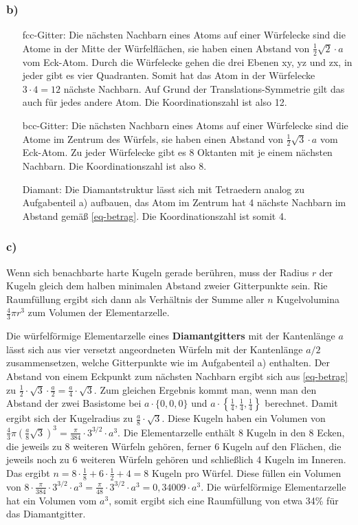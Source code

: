 \documentclass[11pt]{article}
\begin{document}
\subsubsection*{b)}
\begin{itemize}
  \item [fcc-Gitter:] Die nächsten Nachbarn eines Atoms auf einer Würfelecke sind
  die Atome in der Mitte der Würfelflächen, sie haben einen Abstand von
  $\frac{1}{2} \sqrt{2} \cdot a$  vom Eck-Atom. Durch die Würfelecke gehen
  die drei Ebenen xy, yz und zx, in jeder
  gibt es vier Quadranten. Somit hat das Atom in der Würfelecke $3 \cdot 4 = 12$
  nächste Nachbarn. Auf Grund der Translations-Symmetrie gilt das auch für jedes
  andere Atom. Die Koordinationszahl ist also 12.
    \item [bcc-Gitter:] Die nächsten Nachbarn eines Atoms auf einer Würfelecke sind
  die Atome im Zentrum des Würfels, sie haben einen Abstand von $\frac{1}{2} \sqrt{3} \cdot a$
  vom Eck-Atom. Zu jeder Würfelecke gibt es 8 Oktanten mit je einem nächsten Nachbarn.
  Die Koordinationszahl ist also 8.
  \item[Diamant:] Die Diamantstruktur lässt sich mit Tetraedern analog zu
  Aufgabenteil a) aufbauen, das Atom im Zentrum hat 4 nächste Nachbarn im Abstand
  gemäß \eqref{eq-betrag}. Die Koordinationszahl ist somit 4.
\end{itemize}

\subsubsection*{c)} Wenn sich benachbarte harte Kugeln gerade berühren, muss der
Radius $r$ der Kugeln gleich dem halben minimalen Abstand zweier Gitterpunkte sein.
Rie Raumfüllung ergibt sich dann als Verhältnis der Summe aller $n$ Kugelvolumina
$\frac{4}{3} \pi r^3$ zum Volumen der Elementarzelle.

Die würfelförmige Elementarzelle eines \textbf{Diamantgitters} mit der Kantenlänge $a$
lässt sich aus vier versetzt angeordneten Würfeln mit der Kantenlänge $a/2$ zusammensetzen, welche
Gitterpunkte wie im Aufgabenteil a) enthalten. Der Abstand von einem Eckpunkt zum
nächsten Nachbarn ergibt sich aus \eqref{eq-betrag} zu
$\frac{1}{2} \cdot \sqrt{3} \cdot \frac{a}{2} = \frac{a}{4} \cdot \sqrt{3}$. Zum
gleichen Ergebnis kommt man, wenn man den Abstand der zwei Basistome bei $a \cdot \{0,0,0\}$
und $a \cdot \left\{\frac{1}{4}, \frac{1}{4}, \frac{1}{4}\right\}$ berechnet.
Damit ergibt sich der Kugelradius zu $\frac{a}{8} \cdot \sqrt{3}$.
Diese Kugeln haben ein Volumen von $\frac{4}{3} \pi \left(\frac{a}{8} \sqrt{3}\right)^3 =
\frac{\pi}{384} \cdot 3^{3/2} \cdot a^3$. Die Elementarzelle enthält 8 Kugeln in den
8 Ecken, die jeweils zu 8 weiteren Würfeln gehören, ferner 6 Kugeln auf den Flächen,
die jeweils noch zu 6 weiteren Würfeln gehören und schließlich 4 Kugeln im Inneren.
Das ergibt $n = 8 \cdot \frac{1}{8} + 6 \cdot \frac{1}{2} + 4 = 8$ Kugeln pro Würfel.
Diese füllen ein Volumen von $8 \cdot \frac{\pi}{384} \cdot 3^{3/2} \cdot a^3 =
\frac{\pi}{48} \cdot 3^{3/2} \cdot a^3 = 0,34009 \cdot a^3$. Die würfelförmige
Elementarzelle hat ein Volumen vom $a^3$, somit ergibt sich eine Raumfüllung von
etwa 34\% für das Diamantgitter.
\end{document}
